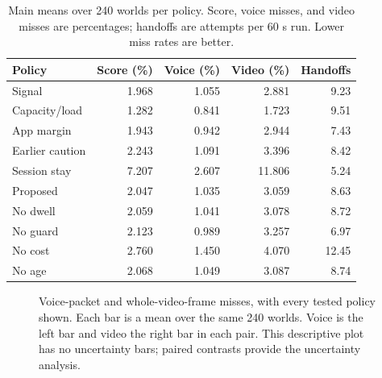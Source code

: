 \documentclass[11pt,a4paper]{article}
\begin{document}
\begin{table}[htbp]\centering\small
\caption{Main means over 240 worlds per policy. Score, voice misses, and video misses are percentages; handoffs are attempts per 60 s run. Lower miss rates are better.}\label{tab:main}
\begin{tabular}{@{}lrrrr@{}}\toprule
Policy & Score (\%) & Voice (\%) & Video (\%) & Handoffs\\\midrule
Signal & 1.968 & 1.055 & 2.881 & 9.23 \\
Capacity/load & 1.282 & 0.841 & 1.723 & 9.51 \\
App margin & 1.943 & 0.942 & 2.944 & 7.43 \\
Earlier caution & 2.243 & 1.091 & 3.396 & 8.42 \\
Session stay & 7.207 & 2.607 & 11.806 & 5.24 \\
Proposed & 2.047 & 1.035 & 3.059 & 8.63 \\
No dwell & 2.059 & 1.041 & 3.078 & 8.72 \\
No guard & 2.123 & 0.989 & 3.257 & 6.97 \\
No cost & 2.760 & 1.450 & 4.070 & 12.45 \\
No age & 2.068 & 1.049 & 3.087 & 8.74 \\
\bottomrule\end{tabular}
\end{table}

\begin{figure}[htbp]\centering
\caption{Voice-packet and whole-video-frame misses, with every tested policy shown. Each bar is a mean over the same 240 worlds. Voice is the left bar and video the right bar in each pair. This descriptive plot has no uncertainty bars; paired contrasts provide the uncertainty analysis.}\label{fig:bars}
\end{figure}
\end{document}
